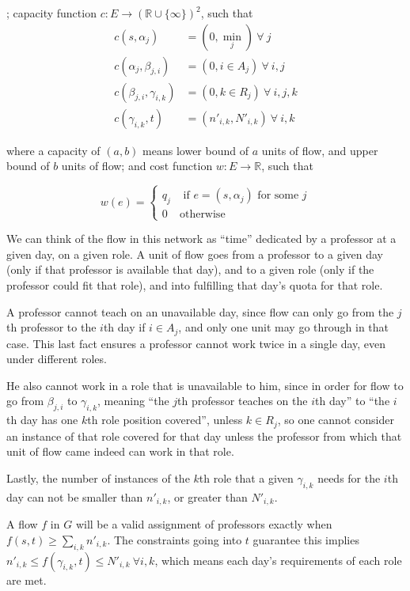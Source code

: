 ; capacity function $c:E \to \left(\mathbb{R} \cup \{\infty\}\right)^2$, such that
\begin{align*}
  c(s, \alpha_j) &= (0, \textstyle\min_j)\ \forall\ j\\
  c(\alpha_j, \beta_{j, i}) &= (0, i \in A_j)\ \forall\ i, j\\
  c(\beta_{j, i}, \gamma_{i, k}) &= (0, k \in R_j)\ \forall\ i, j, k\\
  c(\gamma_{i, k}, t) &= (n'_{i, k}, N'_{i, k})\ \forall\ i, k
\end{align*}

where a capacity of $(a, b)$ means lower bound of $a$ units of flow, and upper bound of $b$ units of flow; and cost function $w:E \to \mathbb{R}$, such that

$$
w(e) =
\begin{cases}
q_j &\text{ if } e = (s, \alpha_j) \text{ for some }j\\
0 & \text{otherwise}
\end{cases}
$$

We can think of the flow in this network as ``time'' dedicated by a professor at a given day, on a given role. A unit of flow goes from a professor to a given day (only if that professor is available that day), and to a given role (only if the professor could fit that role), and into fulfilling that day's quota for that role.

A professor cannot teach on an unavailable day, since flow can only go from the $j$th professor to the $i$th day if $i \in A_j$, and only one unit may go through in that case. This last fact ensures a professor cannot work twice in a single day, even under different roles.

He also cannot work in a role that is unavailable to him, since in order for flow to go from $\beta_{j, i}$ to $\gamma_{i, k}$, meaning ``the $j$th professor teaches on the $i$th day'' to ``the $i$th day has one $k$th role position covered'', unless $k \in R_j$, so one cannot consider an instance of that role covered for that day unless the professor from which that unit of flow came indeed can work in that role.

Lastly, the number of instances of the $k$th role that a given $\gamma_{i, k}$ needs for the $i$th day can not be smaller than $n'_{i, k}$, or greater than $N'_{i, k}$.

A flow $f$ in $G$ will be a valid assignment of professors exactly when $f(s, t) \ge \sum_{i, k} n'_{i, k}$. The constraints going into $t$ guarantee this implies $n'_{i, k} \le f(\gamma_{i, k}, t) \le N'_{i, k}\ \forall i, k$, which means each day's requirements of each role are met.

